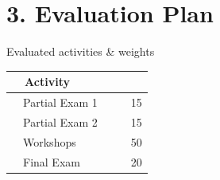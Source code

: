 \documentclass[letterpaper,11pt]{article}
\begin{document}
\section{3. Evaluation Plan}
\begin{table}[h!]
\centering
Evaluated activities \& weights\\
\begin{tabular}{|l|c|}
\hline
~~Activity &~~\multicolumn{1}{l|}{Percentage~~} \\ \hline
~~Partial Exam 1~~&~~15                              \\ \hline
~~Partial Exam 2~~&~~15                              \\ \hline
~~Workshops~~&~~50                              \\ \hline
~~Final Exam~~&~~20                              \\ \hline
\end{tabular}
\end{table}
\end{document}
